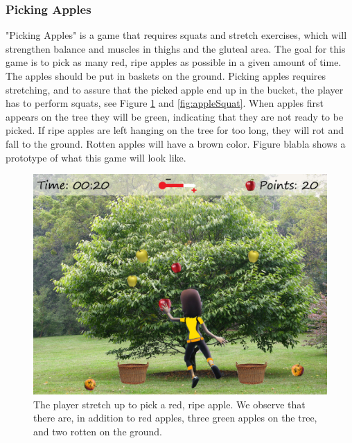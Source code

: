 \subsubsection{Picking Apples}
"Picking Apples" is a game that requires squats and stretch exercises, which will strengthen balance and muscles in thighs and the gluteal area. The goal for this game is to pick as many red, ripe apples as possible in a given amount of time. The apples should be put in baskets on the ground. Picking apples requires stretching, and to assure that the picked apple end up in the bucket, the player has to perform squats, see Figure \ref{fig:appleStretch} and \ref{fig:appleSquat}. When apples first appears on the tree they will be green, indicating that they are not ready to be picked. If ripe apples are left hanging on the tree for too long, they will rot and fall to the ground. Rotten apples will have a brown color. Figure blabla shows a prototype of what this game will look like.  

\begin{figure} [H]
\centering
\includegraphics[scale=0.1]{gameappletreeEng.jpg}
\caption[Picking apples - stretching]{The player stretch up to pick a red, ripe apple. We observe that there are, in addition to red apples, three green apples on the tree, and two rotten on the ground.}
\label{fig:appleStretch}
\end{figure}

